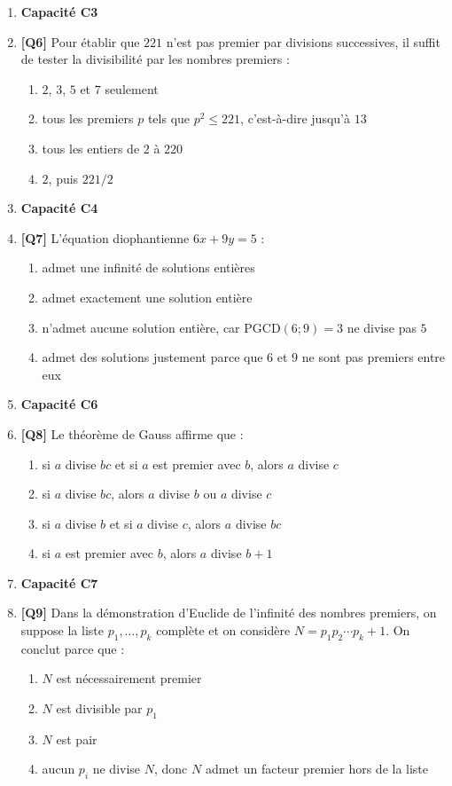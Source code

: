\begin{enumerate}
\item[] \textbf{Capacité C3}

\item \textbf{[Q6]} Pour établir que $221$ n'est pas premier par divisions successives, il suffit de tester la divisibilité par les nombres premiers :
  \begin{enumerate}[label=\Alph*.]
    \item $2$, $3$, $5$ et $7$ seulement
    \item tous les premiers $p$ tels que $p^2\leq221$, c'est-à-dire jusqu'à $13$
    \item tous les entiers de $2$ à $220$
    \item $2$, puis $221/2$
  \end{enumerate}

\item[] \textbf{Capacité C4}

\item \textbf{[Q7]} L'équation diophantienne $6x+9y=5$ :
  \begin{enumerate}[label=\Alph*.]
    \item admet une infinité de solutions entières
    \item admet exactement une solution entière
    \item n'admet aucune solution entière, car $\mathrm{PGCD}(6;9)=3$ ne divise pas $5$
    \item admet des solutions justement parce que $6$ et $9$ ne sont pas premiers entre eux
  \end{enumerate}

\item[] \textbf{Capacité C6}

\item \textbf{[Q8]} Le théorème de Gauss affirme que :
  \begin{enumerate}[label=\Alph*.]
    \item si $a$ divise $bc$ et si $a$ est premier avec $b$, alors $a$ divise $c$
    \item si $a$ divise $bc$, alors $a$ divise $b$ ou $a$ divise $c$
    \item si $a$ divise $b$ et si $a$ divise $c$, alors $a$ divise $bc$
    \item si $a$ est premier avec $b$, alors $a$ divise $b+1$
  \end{enumerate}

\item[] \textbf{Capacité C7}

\item \textbf{[Q9]} Dans la démonstration d'Euclide de l'infinité des nombres premiers, on suppose la liste $p_1,\dots,p_k$ complète et on considère $N=p_1p_2\cdots p_k+1$. On conclut parce que :
  \begin{enumerate}[label=\Alph*.]
    \item $N$ est nécessairement premier
    \item $N$ est divisible par $p_1$
    \item $N$ est pair
    \item aucun $p_i$ ne divise $N$, donc $N$ admet un facteur premier hors de la liste
  \end{enumerate}


\end{enumerate}
